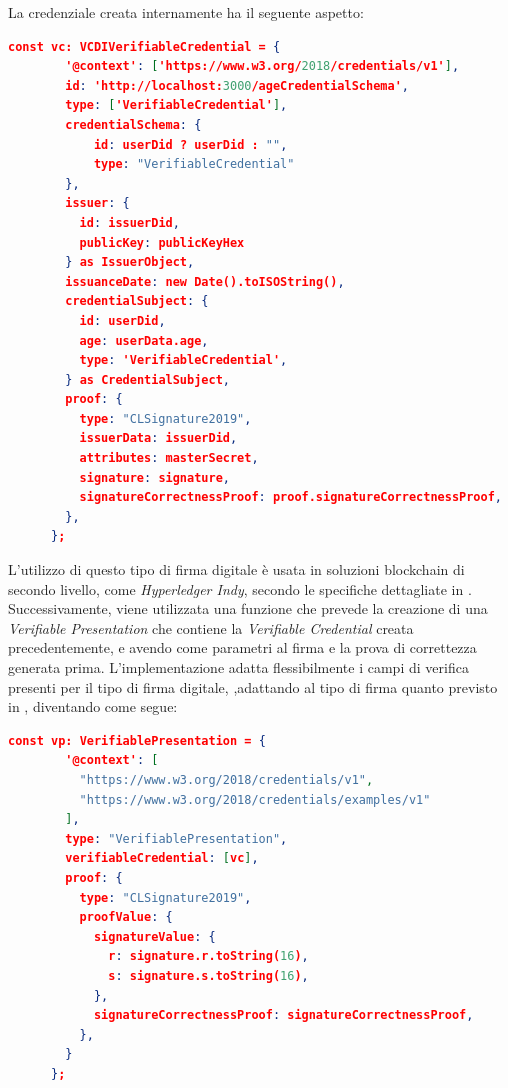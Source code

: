 La credenziale creata internamente ha il seguente aspetto:
\begin{lstlisting}[language=json]
    const vc: VCDIVerifiableCredential = {
        '@context': ['https://www.w3.org/2018/credentials/v1'],
        id: 'http://localhost:3000/ageCredentialSchema',
        type: ['VerifiableCredential'],
        credentialSchema: { 
            id: userDid ? userDid : "",
            type: "VerifiableCredential"
        },        
        issuer: {
          id: issuerDid,
          publicKey: publicKeyHex 
        } as IssuerObject,
        issuanceDate: new Date().toISOString(),
        credentialSubject: {
          id: userDid,
          age: userData.age,
          type: 'VerifiableCredential',
        } as CredentialSubject,
        proof: {
          type: "CLSignature2019", 
          issuerData: issuerDid, 
          attributes: masterSecret,
          signature: signature,
          signatureCorrectnessProof: proof.signatureCorrectnessProof,
        },
      };
\end{lstlisting}
L'utilizzo di questo tipo di firma digitale è usata in soluzioni blockchain di secondo livello, come \textit{Hyperledger Indy}, 
secondo le specifiche dettagliate in \cite{site:clsignature}. \\

Successivamente, viene utilizzata una funzione che prevede la creazione di una \textit{Verifiable Presentation} che contiene la \textit{Verifiable Credential} creata precedentemente,
e avendo come parametri al firma e la prova di correttezza generata prima. L'implementazione adatta flessibilmente i campi di verifica presenti per il tipo di firma digitale, 
,adattando al tipo di firma quanto previsto in \cite{site:vpw3c}, diventando come segue:
\begin{lstlisting}[language=json]
    const vp: VerifiablePresentation = {
        '@context': [
          "https://www.w3.org/2018/credentials/v1",
          "https://www.w3.org/2018/credentials/examples/v1"
        ],
        type: "VerifiablePresentation",
        verifiableCredential: [vc],
        proof: {
          type: "CLSignature2019",
          proofValue: {
            signatureValue: {
              r: signature.r.toString(16),
              s: signature.s.toString(16),
            },
            signatureCorrectnessProof: signatureCorrectnessProof,
          },
        }
      };
\end{lstlisting}

